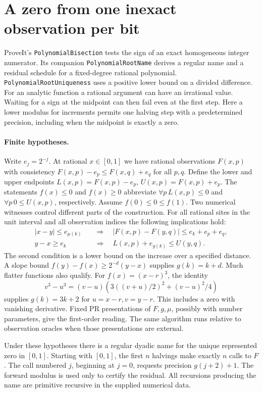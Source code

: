 \section{A zero from one inexact observation per bit}
\label{sec:conditioned-zero}

ProveIt's \texttt{PolynomialBisection} tests the sign of an exact
homogeneous integer numerator. Its companion \texttt{PolynomialRootName}
derives a regular name and a residual schedule for a fixed-degree rational
polynomial. \texttt{PolynomialRootUniqueness} uses a positive lower bound on
a divided difference. For an analytic function a rational argument can have
an irrational value. Waiting for a sign at the midpoint can then fail even at
the first step. Here a lower modulus for increments permits one halving step
with a predetermined precision, including when the midpoint is exactly a zero.

\paragraph{Finite hypotheses.}
Write $e_j=2^{-j}$. At rational $x\in[0,1]$ we have rational observations
$F(x,p)$ with consistency
$F(x,p)-e_p\le F(x,q)+e_q$ for all $p,q$. Define the lower and upper
endpoints $L(x,p)=F(x,p)-e_p$, $U(x,p)=F(x,p)+e_p$.
The statements $f(x)\le0$ and $f(x)\ge0$ abbreviate
$\forall p\,L(x,p)\le0$ and $\forall p\,0\le U(x,p)$, respectively.
Assume $f(0)\le0\le f(1)$. Two numerical witnesses control different parts
of the construction. For all rational sites in the unit interval and all
observation indices the following implications hold:
\begin{align}
 |x-y|\le e_{\mu(k)}
 &\quad\Longrightarrow\quad |F(x,p)-F(y,q)|\le e_k+e_p+e_q,
 \label{eq:zero-forward}\\
 y-x\ge e_k
 &\quad\Longrightarrow\quad
 L(x,p)+e_{g(k)}\le U(y,q).
 \label{eq:zero-inverse}
\end{align}
The second condition is a lower bound on the increase over a specified
distance. A slope bound $f(y)-f(x)\ge2^{-d}(y-x)$ supplies $g(k)=k+d$.
Much flatter functions also qualify. For $f(x)=(x-r)^3$, the identity
\[
 v^3-u^3=(v-u)\left(3((v+u)/2)^2+(v-u)^2/4\right)
\]
supplies $g(k)=3k+2$ for $u=x-r, v=y-r$. This includes a zero with
vanishing derivative. Fixed PR presentations of $F,g,\mu$, possibly with
number parameters, give the first-order reading. The same algorithm runs
relative to observation oracles when those presentations are external.

\begin{theorem}
Under these hypotheses there is a regular dyadic name for the unique
represented zero in $[0,1]$. Starting with $[0,1]$, the first $n$ halvings
make exactly $n$ calls to $F$. The call numbered $j$, beginning at $j=0$,
requests precision $g(j+2)+1$. The forward modulus is used only to certify
the residual. All recursions producing the name are primitive recursive in
the supplied numerical data.
\end{theorem}

